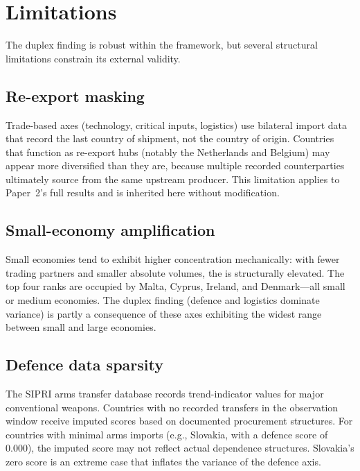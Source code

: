 \section{Limitations}\label{sec:limitations}

The duplex finding is robust within the {\ISI} framework, but
several structural limitations constrain its external validity.

\subsection{Re-export masking}

Trade-based axes (technology, critical inputs, logistics) use
bilateral import data that record the last country of shipment, not
the country of origin.  Countries that function as re-export hubs
(notably the Netherlands and Belgium) may appear more diversified
than they are, because multiple recorded counterparties ultimately
source from the same upstream producer.  This limitation applies to
Paper~2's full results and is inherited here without modification.

\subsection{Small-economy amplification}

Small economies tend to exhibit higher concentration mechanically:
with fewer trading partners and smaller absolute volumes, the
{\HHI} is structurally elevated.  The top four {\ISI} ranks are
occupied by Malta, Cyprus, Ireland, and Denmark---all small or
medium economies.  The duplex finding (defence and logistics
dominate variance) is partly a consequence of these axes exhibiting
the widest range between small and large economies.

\subsection{Defence data sparsity}

The SIPRI arms transfer database records trend-indicator values for
major conventional weapons.  Countries with no recorded transfers in
the observation window receive imputed scores based on documented
procurement structures.  For countries with minimal arms imports
(e.g., Slovakia, with a defence score of 0.000), the imputed score
may not reflect actual dependence structures.  Slovakia's zero
score is an extreme case that inflates the variance of the defence
axis.

